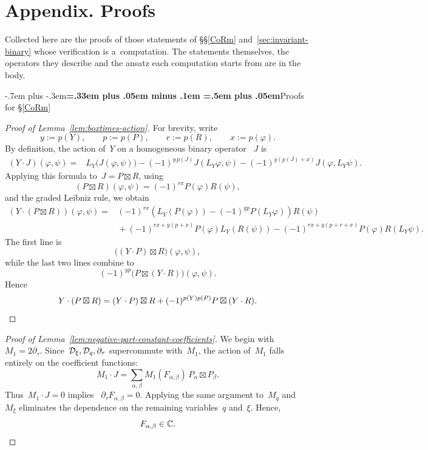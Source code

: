 \documentclass[12pt,a4paper]{amsart}
\makeatletter
\providecommand{\headspaces}{\spaceskip=.33em plus .05em minus .1em \xspaceskip=.5em plus .05em}
\def\subsection{\@startsection{subsection}{2}{0pt}{-1ex \@plus -.4ex \@minus -.2ex}%
  {-.7em plus -.3em}{\normalfont\normalsize\bfseries\boldmath\headspaces}}
\theoremstyle{thm}
\theoremstyle{definition}
\let\ssec\subsection
\newcommand {\Dq}{\cD_q}
\newcommand {\Dxi}{\cD_\xi}
\makeatother
\begin{document}
\section{Appendix. Proofs}\label{app:proofs}
Collected here are the proofs of those statements of \S\S\ref{CoRm}
and~\ref{sec:invariant-binary} whose verification is a~computation. The statements
themselves, the operators they describe and the ansatz each computation starts from are in
the body.

\ssec{Proofs for \S\ref{CoRm}}

\begin{proof}[Proof of Lemma~\textup{\ref{lem:boxtimes-action}}]
For brevity, write
\[
y:=p(Y),\qquad
p:=p(P),\qquad
r:=p(R),\qquad
x:=p(\varphi).
\]
By definition, the action of~\(Y\) on a homogeneous binary operator~%
\(J\) is
\begin{align*}
(Y\cdot J)(\varphi,\psi)
={}&
L_Y\bigl(J(\varphi,\psi)\bigr)
-
(-1)^{y\,p(J)}
J(L_Y\varphi,\psi)
-
(-1)^{y(p(J)+x)}
J(\varphi,L_Y\psi).
\end{align*}
Applying this formula to~\(J=P\boxtimes R\), using
\[
(P\boxtimes R)(\varphi,\psi)
=
(-1)^{rx}P(\varphi)R(\psi),
\]
and the graded Leibniz rule, we obtain
\begin{align*}
(Y\cdot(P\boxtimes R))(\varphi,\psi)
={}&
(-1)^{rx}
\left(
L_Y(P(\varphi))
-
(-1)^{yp}P(L_Y\varphi)
\right)R(\psi)
\\
&{}+
(-1)^{rx+y(p+x)}
P(\varphi)L_Y(R(\psi))
-
(-1)^{rx+y(p+r+x)}
P(\varphi)R(L_Y\psi).
\end{align*}
The first line is
\[
\bigl((Y\cdot P)\boxtimes R\bigr)(\varphi,\psi),
\]
while the last two lines combine to
\[
(-1)^{yp}
\bigl(P\boxtimes(Y\cdot R)\bigr)(\varphi,\psi).
\]
Hence
\[
Y\cdot(P\boxtimes R)
=
(Y\cdot P)\boxtimes R
+
(-1)^{p(Y)p(P)}
P\boxtimes(Y\cdot R).\qedhere
\]
\end{proof}

\begin{proof}[Proof of Lemma~\textup{\ref{lem:negative-part-constant-coefficients}}]
We begin with~%
$M_1=2\partial_\tau.$
Since~\(\Dxi,\Dq,\partial_\tau\) supercommute with~\(M_1\), the action of~\(M_1\) falls
entirely on the coefficient functions:
\[
M_1\cdot J
=
\sum_{\alpha,\beta}
M_1(F_{\alpha,\beta})\,
P_\alpha\boxtimes P_\beta.
\]
Thus~\(M_1\cdot J=0\) implies~%
$
\partial_\tau F_{\alpha,\beta}=0.
$  Applying the same argument to~\(M_q\) and~\(M_\xi\) eliminates the
dependence on the remaining variables~\(q\) and~\(\xi\). Hence,
\[
F_{\alpha,\beta}\in\mathbb C.\qedhere
\]
\end{proof}
\end{document}
